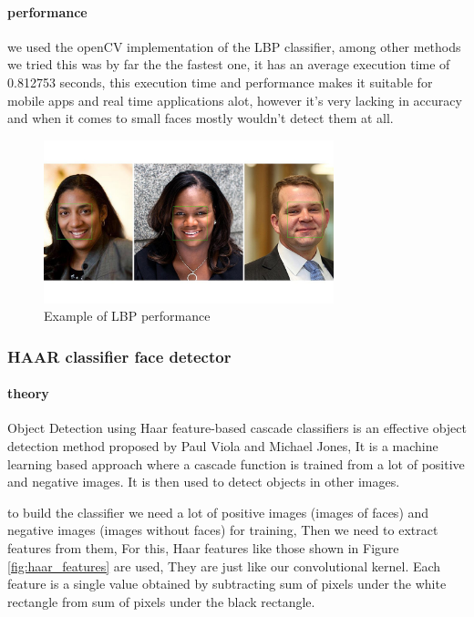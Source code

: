 \paragraph{performance}
we used the openCV implementation of the LBP classifier, among other methods we tried this was by far the the fastest one, it has an average execution time of 0.812753 seconds, this execution time and performance makes it suitable for mobile apps and real time applications alot, however it's very lacking in accuracy and when it comes to small faces mostly wouldn't detect them at all.

\begin{figure}
	\centering
	\includegraphics[width=0.75\textwidth]{images/lbp_example.jpg}
	\caption{Example of LBP performance}
	\label{fig:LBP_example}
\end{figure}


\subsubsection{HAAR classifier face detector}

\paragraph{theory}
Object Detection using Haar feature-based cascade classifiers is an effective object detection method proposed by Paul Viola and Michael Jones\cite{haar}, It is a machine learning based approach where a cascade function is trained from a lot of positive and negative images. It is then used to detect objects in other images.

to build the classifier we need a lot of positive images (images of faces) and negative images (images without faces) for training, Then we need to extract features from them, For this, Haar features like those shown in Figure \ref{fig:haar_features} are used, They are just like our convolutional kernel. Each feature is a single value obtained by subtracting sum of pixels under the white rectangle from sum of pixels under the black rectangle.

